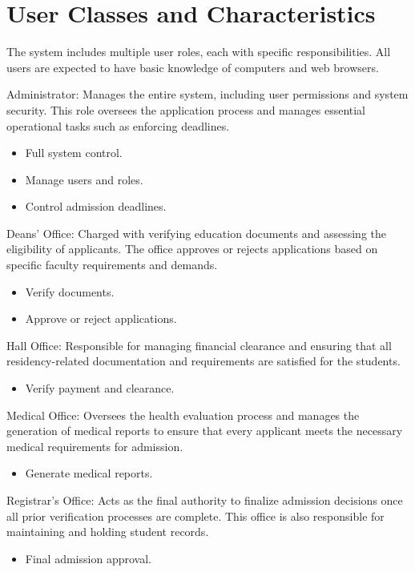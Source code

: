 \section{User Classes and Characteristics}

The system includes multiple user roles, each with specific responsibilities. All users are expected to have basic knowledge of computers and web browsers.

\noindent Administrator:
Manages the entire system, including user permissions and system security. This role oversees the application process and manages essential operational tasks such as enforcing deadlines.
\begin{itemize}
    \item Full system control.
    \item Manage users and roles.
    \item Control admission deadlines.
\end{itemize}

\vspace{0.2cm}
\noindent Deans' Office:
Charged with verifying education documents and assessing the eligibility of applicants. The office approves or rejects applications based on specific faculty requirements and demands.
\begin{itemize}
    \item Verify documents.
    \item Approve or reject applications.
\end{itemize}

\vspace{0.2cm}
\noindent Hall Office:
Responsible for managing financial clearance and ensuring that all residency-related documentation and requirements are satisfied for the students.
\begin{itemize}
    \item Verify payment and clearance.
\end{itemize}

\vspace{0.2cm}
\noindent Medical Office:
Oversees the health evaluation process and manages the generation of medical reports to ensure that every applicant meets the necessary medical requirements for admission.
\begin{itemize}
    \item Generate medical reports.
\end{itemize}

\vspace{0.2cm}
\noindent Registrar's Office:
Acts as the final authority to finalize admission decisions once all prior verification processes are complete. This office is also responsible for maintaining and holding student records.
\begin{itemize}
    \item Final admission approval.
\end{itemize}

